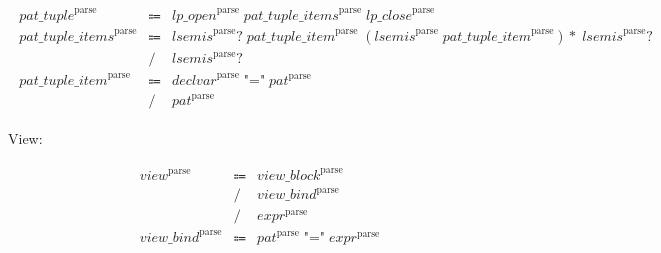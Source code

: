 \begin{align*}
    \begin{array}{rcll}
        \mathit{pat\_tuple}^\mathrm{parse}
        &\Coloneq &\mathit{lp\_open}^\mathrm{parse}\; \mathit{pat\_tuple\_items}^\mathrm{parse}\; \mathit{lp\_close}^\mathrm{parse} \\
        \mathit{pat\_tuple\_items}^\mathrm{parse}
        &\Coloneq &\mathit{lsemis}^\mathrm{parse}{?}\; \mathit{pat\_tuple\_item}^\mathrm{parse}\; (\mathit{lsemis}^\mathrm{parse}\; \mathit{pat\_tuple\_item}^\mathrm{parse}){*}\; \mathit{lsemis}^\mathrm{parse}{?} \\
        &\mathrel{/} &\mathit{lsemis}^\mathrm{parse}{?} \\
        \mathit{pat\_tuple\_item}^\mathrm{parse}
        &\Coloneq &\mathit{declvar}^\mathrm{parse}\; \texttt{"="}\; \mathit{pat}^\mathrm{parse} \\
        &\mathrel{/} &\mathit{pat}^\mathrm{parse}
    \end{array}
\end{align*}

View:

\begin{align*}
    \begin{array}{rcll}
        \mathit{view}^\mathrm{parse}
        &\Coloneq &\mathit{view\_block}^\mathrm{parse} \\
        &\mathrel{/} &\mathit{view\_bind}^\mathrm{parse} \\
        &\mathrel{/} &\mathit{expr}^\mathrm{parse} \\
        \mathit{view\_bind}^\mathrm{parse}
        &\Coloneq &\mathit{pat}^\mathrm{parse}\; \texttt{"="}\; \mathit{expr}^\mathrm{parse}
    \end{array}
\end{align*}

